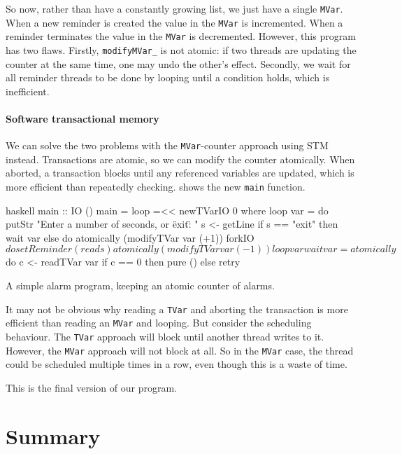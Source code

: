 So now, rather than have a constantly growing list, we just have a
single \verb|MVar|.  When a new reminder is created the value in the
\verb|MVar| is incremented.  When a reminder terminates the value in
the \verb|MVar| is decremented.  However, this program has two flaws.
Firstly, \verb|modifyMVar_| is not atomic: if two threads are updating
the counter at the same time, one may undo the other's effect.
Secondly, we wait for all reminder threads to be done by looping until
a condition holds, which is inefficient.

\paragraph{Software transactional memory}
We can solve the two problems with the \verb|MVar|-counter approach
using STM instead.  Transactions are atomic, so we can modify the
counter atomically.  When aborted, a transaction blocks until any
referenced variables are updated, which is more efficient than
repeatedly checking.   shows the new \verb|main|
function.

\begin{listing}
\centering
\begin{cminted}{haskell}
main :: IO ()
main = loop =<< newTVarIO 0 where
  loop var = do
    putStr "Enter a number of seconds, or \"exit\": "
    s <- getLine
    if s == "exit"
      then wait var
      else do
        atomically (modifyTVar var (+1))
        forkIO $ do
          setReminder (read s)
          atomically (modifyTVar var (-1))
        loop var
  wait var = atomically $ do
    c <- readTVar var
    if c == 0 then pure () else retry
\end{cminted}
\caption{A simple alarm program, keeping an atomic counter of alarms.}\label{lst:ch_ex5}
\end{listing}

It may not be obvious why reading a \verb|TVar| and aborting the
transaction is more efficient than reading an \verb|MVar| and looping.
But consider the scheduling behaviour.  The \verb|TVar| approach will
block until another thread writes to it.  However, the \verb|MVar|
approach will not block at all.  So in the \verb|MVar| case, the
thread could be scheduled multiple times in a row, even though this is
a waste of time.

This is the final version of our program.

\vfill\pagebreak
\section{Summary}

